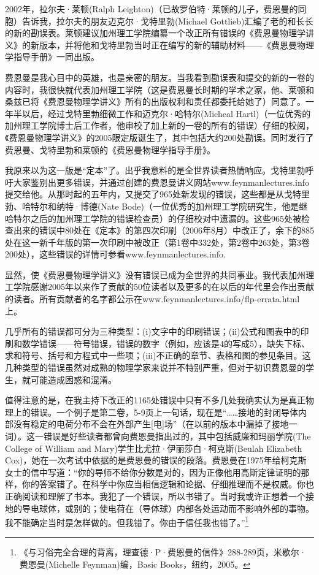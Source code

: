 \documentclass[UTF8, 12pt, a4paper, twoside]{ctexbook}
\begin{document}
2002年，拉尔夫·莱顿(Ralph Leighton)（已故罗伯特·莱顿的儿子，费恩曼的同胞）告诉我，拉尔夫的朋友迈克尔·戈特里勃(Michael Gottlieb)汇编了老的和长长的新的勘误表。莱顿建议加州理工学院编纂一个改正所有错误的《费恩曼物理学讲义》的新版本，并将他和戈特里勃当时正在编写的新的辅助材料——《费恩曼物理学指导手册》一同出版。

费恩曼是我心目中的英雄，也是亲密的朋友。当我看到勘误表和提交的新的一卷的内容时，我很快就代表加州理工学院（这是费恩曼长时期的学术之家，他、莱顿和桑兹已将《费恩曼物理学讲义》所有的出版权利和责任都委托给她了）同意了。一年半以后，经过戈特里勃细微工作和迈克尔·哈特尔(Micheal Hartl)（一位优秀的加州理工学院博士后工作者，他审校了加上新的一卷的所有的错误）仔细的校阅，《费恩曼物理学讲义》的2005限定版诞生了，其中包括大约200处勘误。同时发行了费恩曼、戈特里勃和莱顿的《费恩曼物理学指导手册》。

我原来以为这一版是“定本”了。出乎我意料的是全世界读者热情响应。戈特里勃呼吁大家鉴别出更多错误，并通过创建的费恩曼讲义网站www.feynmanlectures.info提交给他。从那时起的五年内，又提交了965处新发现的错误，这些都是从戈特里勃、哈特尔和纳特·博德(Nate Bode)（一位优秀的加州理工学院研究生，他是继哈特尔之后的加州理工学院的错误检查员）的仔细校对中遗漏的。这些965处被检查出来的错误中80处在《定本》的第四次印刷（2006年8月）中改正了，余下的885处在这一新千年版的第一次印刷中被改正（第1卷中332处，第2卷中263处，第3卷200处），这些错误的详情可参看www.feynmanlectures.info.

显然，使《费恩曼物理学讲义》没有错误已成为全世界的共同事业。我代表加州理工学院感谢2005年以来作了贡献的50位读者以及更多的在以后的年代里会作出贡献的读者。所有贡献者的名字都公示在www.feynmanlectures.info/flp-errata.html上。

几乎所有的错误都可分为三种类型：(i)文字中的印刷错误；(ii)公式和图表中的印刷和数学错误——符号错误，错误的数字（例如，应该是4的写成5），缺失下标、求和符号、括号和方程式中一些项；(iii)不正确的章节、表格和图的参见条目。这几种类型的错误虽然对成熟的物理学家来说并不特别严重，但对于初识费恩曼的学生，就可能造成困惑和混淆。

值得注意的是，在我主持下改正的1165处错误中只有不多几处我确实认为是真正物理上的错误。一个例子是第二卷，5-9页上一句话，现在是“……接地的封闭导体内部没有稳定的电荷分布不会在外部产生[电]场”（在以前的版本中漏掉了接地一词）。这一错误是好些读者都曾向费恩曼指出过的，其中包括威廉和玛丽学院(The College of William and Mary)学生比尤拉·伊丽莎白·柯克斯(Beulah Elizabeth Cox)，她在一次考试中依据的是费恩曼的错误的段落。费恩曼在1975年给柯克斯女士的信中写道：“你的导师不给你分数是对的，因为正像他用高斯定律证明的那样，你的答案错了。在科学中你应当相信逻辑和论据、仔细推理而不是权威。你也正确阅读和理解了书本。我犯了一个错误，所以书错了。当时我或许正想着一个接地的导电球体，或别的；使电荷在（导体球）内部各处运动而不影响外部的事物。我不能确定当时是怎样做的。但我错了。你由于信任我也错了。”\footnote{《与习俗完全合理的背离，理查德·P·费恩曼的信件》288-289页，米歇尔·费恩曼(Michelle Feynman)编，Basic Books，纽约，2005。}
\end{document}
